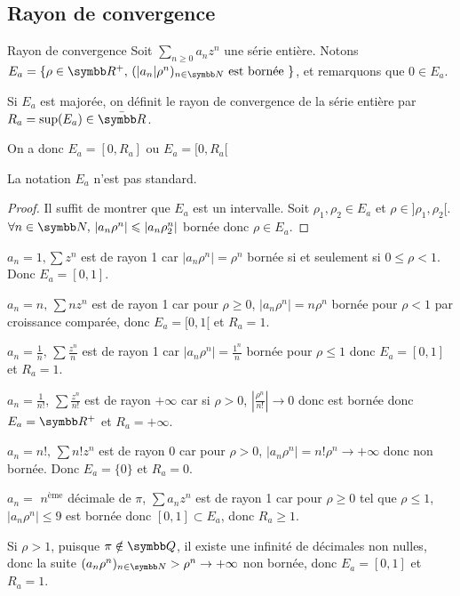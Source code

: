 \subsection{Rayon de convergence }

\begin{theoreme}{Rayon de convergence}{}
    Soit $\sum_{n \geqslant 0} a_n z^n$ une série entière. Notons $E_a = \{\rho \in \R^+, \, (|a_n|\rho^n)_{n \in \N} \text{ est bornée }\}$,
    et remarquons que $0 \in E_a$.

    \svspace Si $E_a$ est majorée, on définit le rayon de convergence de la série entière par $R_a = \sup(E_a) \in \bar{\R}$.

    On a donc $E_a = [0, R_a]$ ou $E_a = [0, R_a[$ 
\end{theoreme}

\begin{remarque}
    La notation $E_a$ n'est pas standard.
\end{remarque}


\begin{proof}
    Il suffit de montrer que $E_a$ est un intervalle. Soit $\rho_1, \rho_2 \in E_a$ et 
    $\rho \in ]\rho_1, \rho_2[$. $\forall n \in \N, \, |a_n \rho^n| \leqslant |a_n \rho_2^n|$ bornée donc $\rho \in E_a$.


\end{proof}



\begin{exemple}
    $a_n = 1, \sum z^n$ est de rayon 1 car $|a_n \rho^n| = \rho^n$ bornée si et seulement si $0 \leqslant \rho < 1$.
    Donc $E_a = [0, 1]$. 

    \lvspace $a_n = n, \, \sum n z^n$ est de rayon 1 car pour $\rho \geqslant 0$, $|a_n \rho^n| = n \rho^n$ bornée
    pour $\rho < 1$ par croissance comparée, donc $E_a = [0, 1[$ et $R_a = 1$.

    \lvspace $a_n = \frac 1 n, \, \sum \frac{z^n}{n}$ est de rayon 1 car 
    $|a_n \rho^n| = \frac{1^n} n $ bornée pour $\rho \leqslant 1$ donc $E_a = [0, 1]$ et $R_a = 1$.

    \lvspace $a_n = \frac 1 {n!}, \, \sum \frac{z^n}{n!}$ est de rayon $+\infty$ car
    si $\rho > 0$, $|\frac{\rho^n} {n!}| \to 0$ donc est bornée donc 
    $E_a = \R^+$ et $R_a = +\infty$.
    
    \lvspace $a_n = n!, \, \sum n! z^n$ est de rayon 0 car pour $\rho > 0$,
    $|a_n \rho^n| = n! \rho^n \to +\infty$ donc non bornée. Donc $E_a = \{0\}$ et $R_a = 0$.

    \lvspace $a_n = $ $n^{\text{ème}}$ décimale de $\pi$, $\sum a_n z^n$ est de rayon 1 car
    pour $\rho \geqslant 0$ tel que $\rho \leqslant 1$, $|a_n \rho^n| \leqslant 9$ est bornée 
    donc $[0, 1] \subset E_a$, donc $R_a \geqslant 1$.

    Si $\rho > 1$, puisque $\pi \notin \Q$, il existe une infinité de décimales non nulles, 
    donc la suite $(a_n \rho^n)_{n \in \N} > \rho^n \to + \infty $ non bornée, 
    donc $E_a = [0, 1]$ et $R_a = 1$. 
\end{exemple}

